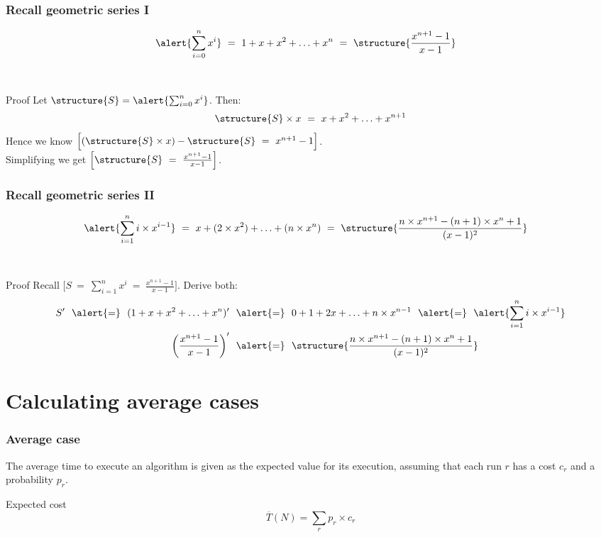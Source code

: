 \documentclass[aspectratio=169]{beamer}
\begin{document}
\begin{frame}\frametitle{Recall geometric series I} 
\begin{align*}
  \alert{\sum_{i=0}^n x^i} &~=~ 1 + x + x^2 + \ldots + x^n ~=~
      \structure{\frac{x^{n+1}-1}{x-1}}
\end{align*}

~\\[2mm]

\begin{block}{Proof}
\centering
Let $\structure{S}=\alert{\sum_{i=0}^n x^i}$. Then:
$$\structure{S}\times x ~=~ x + x^2 + \ldots + x^{n+1}$$
Hence we know $\Big[(\structure{S}\times x)-\structure{S} ~=~ x^{n+1}-1\Big]$.
\\
Simplifying we get $\Big[\structure{S} ~=~ \frac{x^{n+1}-1}{x-1}\Big]$.
\end{block}
\end{frame}

\begin{frame}\frametitle{Recall geometric series II}
\begin{align*}
  \alert{\sum_{i=1}^n i \times x^{i-1}} &~=~ x + (2\times x^2) + \ldots + (n\times x^n) ~=~
      \structure{\frac{n\times x^{n+1}-(n+1)\times x^n +1}{(x-1)^2}}
\end{align*}

~\\[2mm]

\begin{block}{Proof}
\centering
Recall $\Big[S ~=~ \sum_{i=1}^n x^i ~=~ \frac{x^{n+1}-1}{x-1}\Big]$.
Derive both:
\begin{align*}
 S'
   ~~\alert{=}~~ (1 + x + x^2 + \ldots + x^n)'
  &~~\alert{=}~~ 0 + 1 + 2x + \ldots + n\times x^{n-1}
   ~~\alert{=}~~\alert{\sum_{i=1}^n i \times x^{i-1}}
\\
\left(\frac{x^{n+1}-1}{x-1}\right)'
  &~~\alert{=}~~
   \structure{\frac{n\times x^{n+1}-(n+1)\times x^n +1}{(x-1)^2}}
\end{align*}
\end{block}
\end{frame}


\section{Calculating average cases}


\begin{frame}\frametitle{Average case}
    
The average time to execute an algorithm is given as the \alert{expected value} for its execution, assuming that each run $r$ has a cost $c_r$ and a probability $p_r$.

\begin{block}{Expected cost}
  $$\overline{T}(N) = \sum_r p_r \times c_r$$
\end{block}
\end{frame}
\end{document}
